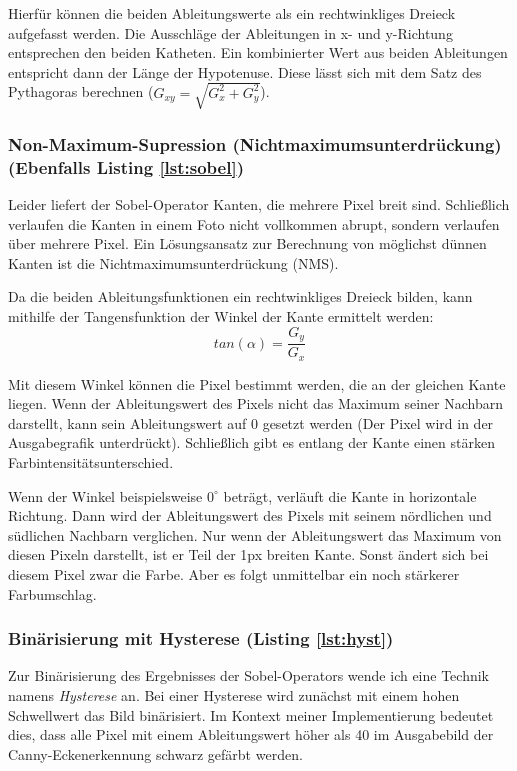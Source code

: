 Hierfür können die beiden Ableitungswerte als ein rechtwinkliges Dreieck aufgefasst werden. Die Ausschläge der Ableitungen in x- und y-Richtung entsprechen den beiden Katheten. Ein kombinierter Wert aus beiden Ableitungen entspricht dann der Länge der Hypotenuse. Diese lässt sich mit dem Satz des Pythagoras berechnen (\(G_{xy} = \sqrt{G_x^2 + G_y^2}\)).

\subsubsection{Non-Maximum-Supression (Nichtmaximumsunterdrückung) (Ebenfalls Listing \ref{lst:sobel})}
Leider liefert der Sobel-Operator Kanten, die mehrere Pixel breit sind. Schließlich verlaufen die Kanten in einem Foto nicht vollkommen abrupt, sondern verlaufen über mehrere Pixel. 
Ein Lösungsansatz zur Berechnung von möglichst dünnen Kanten ist die Nichtmaximumsunterdrückung (NMS). 

Da die beiden Ableitungsfunktionen ein rechtwinkliges Dreieck bilden, kann mithilfe der Tangensfunktion der Winkel der Kante ermittelt werden:
\begin{equation}
	tan(\alpha) = \frac{G_y}{G_x}
\end{equation}

Mit diesem Winkel können die Pixel bestimmt werden, die an der gleichen Kante liegen. Wenn der Ableitungswert des Pixels nicht das Maximum seiner Nachbarn darstellt, kann sein Ableitungswert auf 0 gesetzt werden (Der Pixel wird in der Ausgabegrafik unterdrückt). Schließlich gibt es entlang der Kante einen stärken Farbintensitätsunterschied.  

Wenn der Winkel beispielsweise \(0^{\circ}\) beträgt, verläuft die Kante in horizontale Richtung. Dann wird der Ableitungswert des Pixels mit seinem nördlichen und südlichen Nachbarn verglichen.
Nur wenn der Ableitungswert das Maximum von diesen Pixeln darstellt, ist er Teil der 1px breiten Kante. Sonst ändert sich bei diesem Pixel zwar die Farbe. Aber es folgt unmittelbar ein noch stärkerer Farbumschlag.

\subsubsection{Binärisierung mit Hysterese (Listing \ref{lst:hyst})}
Zur Binärisierung des Ergebnisses der Sobel-Operators wende ich eine Technik namens \textit{Hysterese} an. Bei einer Hysterese wird zunächst mit einem hohen Schwellwert das Bild binärisiert. 
Im Kontext meiner Implementierung bedeutet dies, dass alle Pixel mit einem Ableitungswert höher als 40 im Ausgabebild der Canny-Eckenerkennung schwarz gefärbt werden.

